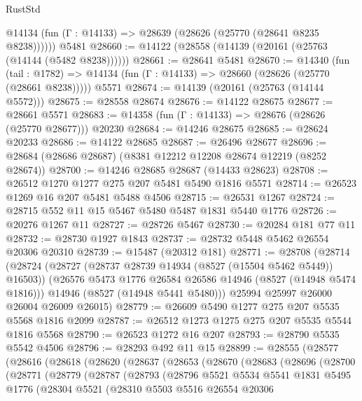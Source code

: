 \begin{lexlean}{RustStd}
\begin{coremodule}
      @14134 (fun (Γ : @14133) => @28639 (@28626 (@25770 (@28641 @8235 @8238))))))
    @5481
@28660 := @14122 (@28558 (@14139 (@20161 (@25763 (@14144 (@5482 @8238))))))
@28661 := @28641 @5481
@28670 := @14340
    (fun (tail : @1782) => @14134 (fun (Γ : @14133) => @28660 (@28626 (@25770 (@28661 @8238)))))
    @5571
@28674 := @14139 (@20161 (@25763 (@14144 @5572)))
@28675 := @28558 @28674
@28676 := @14122 @28675
@28677 := @28661 @5571
@28683 := @14358 (fun (Γ : @14133) => @28676 (@28626 (@25770 @28677))) @20230
@28684 := @14246 @28675
@28685 := @28624 @20233
@28686 := @14122 @28685
@28687 := @26496 @28677
@28696 := @28684 (@28686 @28687) (@8381 @12212 @12208 @28674 @12219 (@8252 @28674))
@28700 := @14246 @28685 @28687 (@14433 @28623)
@28708 := @26512 @1270 @1277 @275 @207 @5481 @5490 @1816 @5571
@28714 := @26523 @1269 @16 @207 @5481 @5488 @4506
@28715 := @26531 @1267
@28724 := @28715 @552 @11 @15 @5467 @5480 @5487 @1831 @5440 @1776
@28726 := @20276 @1267 @11
@28727 := @28726 @5467
@28730 := @20284 @181 @77 @11
@28732 := @28730 @1927 @1843
@28737 := @28732 @5448 @5462 @26554 @20306 @20310
@28739 := @15487 (@20312 @181)
@28771 := @28708
    (@28714
      (@28724
        (@28727 (@28737 @28739 @14934 (@8527 (@15504 @5462 @5449)) @16503))
        (@26576 @5473 @1776 @26584 @26586 @14946 (@8527 (@14948 @5474 @1816)))
        @14946
        (@8527 (@14948 @5441 @5480)))
      @25994
      @25997
      @26000
      @26004
      @26009
      @26015)
@28779 := @26609 @5490 @1277 @275 @207 @5535 @5568 @1816 @2099
@28787 := @26512 @1273 @1275 @275 @207 @5535 @5544 @1816 @5568
@28790 := @26523 @1272 @16 @207
@28793 := @28790 @5535 @5542 @4506
@28796 := @28293 @492 @11 @15
@28899 := @28555
    (@28577
      (@28616
        (@28618
          (@28620
            (@28637
              (@28653
                (@28670
                  (@28683
                    (@28696
                      (@28700
                        (@28771
                          (@28779
                            (@28787
                              (@28793
                                (@28796
                                  @5521
                                  @5534
                                  @5541
                                  @1831
                                  @5495
                                  @1776
                                  (@28304
                                    @5521
                                    (@28310
                                      @5503
                                      @5516
                                      @26554
                                      @20306

\end{coremodule}
\end{lexlean}
